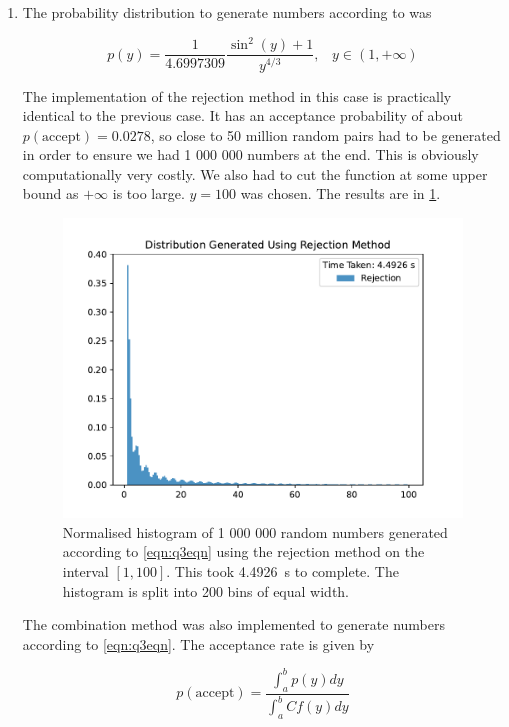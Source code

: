 \documentclass[11pt]{article}
\begin{document}
\begin{enumerate}
    \item The probability distribution to generate numbers according to was
    
    \begin{equation}
        p(y)=\frac{1}{4.6997309}\frac{\sin^2(y)+1}{y^{4/3}},\;\;\;y\in(1,+\infty)
        \label{eqn:q3eqn}
    \end{equation}

    The implementation of the rejection method in this case is practically identical to the previous case. It has an acceptance probability of about $p(\text{accept})=0.0278$, so close to 50 million random pairs had to be generated in order to ensure we had 1 000 000 numbers at the end. This is obviously computationally very costly. We also had to cut the function at some upper bound as $+\infty$ is too large. $y=100$ was chosen. The results are in \cref{fig:q3rejection}.
    
    \begin{figure}[h]
        \begin{center}
            \includegraphics[width=.6\textwidth]{Plots/q3rejection.pdf}
            \caption{Normalised histogram of 1 000 000 random numbers generated according to \cref{eqn:q3eqn} using the rejection method on the interval $[1,100]$. This took \SI{4.4926}{\second} to complete. The histogram is split into 200 bins of equal width.}
            \label{fig:q3rejection}
        \end{center}
    \end{figure}

    The combination method was also implemented to generate numbers according to \cref{eqn:q3eqn}. The acceptance rate is given by

    \begin{equation}
        p(\text{accept})=\frac{\int_a^b p(y) dy}{\int_a^b Cf(y) dy}
        \label{eqn:q3acceptance}
    \end{equation}


\end{enumerate}
\end{document}
